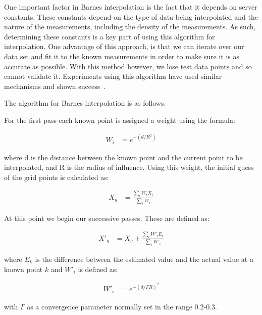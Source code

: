             One important factor in Barnes interpolation is the fact that it depends on server constants. These constants depend on the type of data being interpolated and the nature of the measurements, including the density of the measurements. As such, determining these constants is a key part of using this algorithm for interpolation. One advantage of this approach, is that we can iterate over our data set and fit it to the known measurements in order to make sure it is as accurate as possible. With this method however, we lose test data points and so cannot validate it. Experiments using this algorithm have used similar mechanisms and shown success~\cite{pmconcentrationmaps}.

            The algorithm for Barnes interpolation is as follows.

            For the first pass each known point is assigned a weight using the formula: 

            \begin{align*}
                W_{i} &= e^{-(d/R^{2})}
            \end{align*}
            
            where d is the distance between the known point and the current point to be interpolated, and R is the radius of influence. Using this weight, the initial guess of the grid points is calculated as: 
            
            \begin{align*}
                X_{g} &= \frac{\sum_{i}{W_{i}X_{i}}}{\sum_{i}{W_{i}}}
            \end{align*}

            At this point we begin our successive passes. These are defined as:

            \begin{align*}
                X'_{g} &= X_{g} + \frac{\sum_{i}{W'_{i}E_{i}}}{\sum_{i}{W'_{i}}}
            \end{align*}

            where $E_{k}$ is the difference between the estimated value and the actual value at a known point $k$ and $W'_{i}$ is defined as:

            \begin{align*}
                W'_{i} &= e^{-(d/\Gamma R)^{2}}
            \end{align*}

            with $\Gamma$ as a convergence parameter normally set in the range 0.2-0.3.



